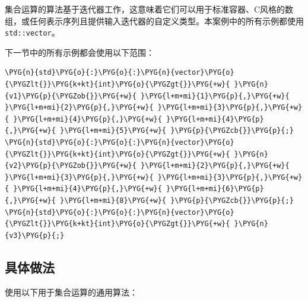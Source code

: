 
集合运算的算法基于迭代器工作，这意味着它们可以用于标准容器、C风格的数组，或任何表示序列且提供输入迭代器的自定义类型。本案例中的所有示例都使用\texttt{std::\allowbreak{}vector}。



下一节中的所有示例都会使用以下范围：



\begin{codeblockbg}
\begin{Verbatim}[commandchars=\\\{\},breaklines=true,breakanywhere=true,fontsize=\codefont,xleftmargin=17bp]
\PYG{n}{std}\PYG{o}{:}\PYG{o}{:}\PYG{n}{vector}\PYG{o}{\PYGZlt{}}\PYG{k+kt}{int}\PYG{o}{\PYGZgt{}}\PYG{+w}{ }\PYG{n}{v1}\PYG{p}{\PYGZob{}}\PYG{+w}{ }\PYG{l+m+mi}{1}\PYG{p}{,}\PYG{+w}{ }\PYG{l+m+mi}{2}\PYG{p}{,}\PYG{+w}{ }\PYG{l+m+mi}{3}\PYG{p}{,}\PYG{+w}{ }\PYG{l+m+mi}{4}\PYG{p}{,}\PYG{+w}{ }\PYG{l+m+mi}{4}\PYG{p}{,}\PYG{+w}{ }\PYG{l+m+mi}{5}\PYG{+w}{ }\PYG{p}{\PYGZcb{}}\PYG{p}{;}
\PYG{n}{std}\PYG{o}{:}\PYG{o}{:}\PYG{n}{vector}\PYG{o}{\PYGZlt{}}\PYG{k+kt}{int}\PYG{o}{\PYGZgt{}}\PYG{+w}{ }\PYG{n}{v2}\PYG{p}{\PYGZob{}}\PYG{+w}{ }\PYG{l+m+mi}{2}\PYG{p}{,}\PYG{+w}{ }\PYG{l+m+mi}{3}\PYG{p}{,}\PYG{+w}{ }\PYG{l+m+mi}{3}\PYG{p}{,}\PYG{+w}{ }\PYG{l+m+mi}{4}\PYG{p}{,}\PYG{+w}{ }\PYG{l+m+mi}{6}\PYG{p}{,}\PYG{+w}{ }\PYG{l+m+mi}{8}\PYG{+w}{ }\PYG{p}{\PYGZcb{}}\PYG{p}{;}
\PYG{n}{std}\PYG{o}{:}\PYG{o}{:}\PYG{n}{vector}\PYG{o}{\PYGZlt{}}\PYG{k+kt}{int}\PYG{o}{\PYGZgt{}}\PYG{+w}{ }\PYG{n}{v3}\PYG{p}{;}
\end{Verbatim}
\end{codeblockbg}



\subsection{具体做法}



使用以下用于集合运算的通用算法：



